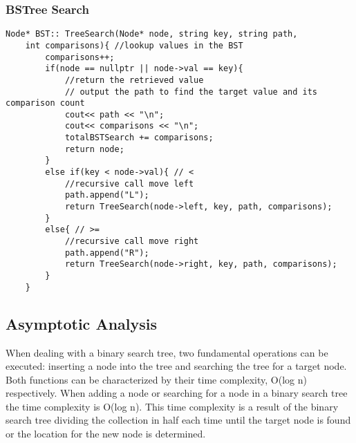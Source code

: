 \documentclass[letterpaper, 10pt,DIV=13]{scrartcl}
\numberwithin{equation}{section} %
\numberwithin{figure}{section} %
\numberwithin{table}{section} %
\begin{document}
\subsubsection*{BSTree Search}
    \lstset{numbers=left, numberstyle=\tiny, stepnumber=1, numbersep=5pt, basicstyle=\footnotesize\ttfamily}
    \begin{lstlisting}[frame=single, ]
   Node* BST:: TreeSearch(Node* node, string key, string path, 
    int comparisons){ //lookup values in the BST
        comparisons++;
        if(node == nullptr || node->val == key){
            //return the retrieved value
            // output the path to find the target value and its comparison count
            cout<< path << "\n";
            cout<< comparisons << "\n";
            totalBSTSearch += comparisons;
            return node;
        }
        else if(key < node->val){ // <
            //recursive call move left
            path.append("L");
            return TreeSearch(node->left, key, path, comparisons);
        }
        else{ // >=
            //recursive call move right
            path.append("R");
            return TreeSearch(node->right, key, path, comparisons);
        }
    }

\end{lstlisting}


\subsection{Asymptotic Analysis}
When dealing with a binary search tree, two fundamental operations can be executed: inserting a node into the tree and searching the tree for a target node. Both functions can be characterized by their time complexity, O(log n) respectively. When adding a node or searching for a node in a binary search tree the time complexity is O(log n). This time complexity is a result of the binary search tree dividing the collection in half each time until the target node is found or the location for the new node is determined.


\pagebreak

\end{document}
